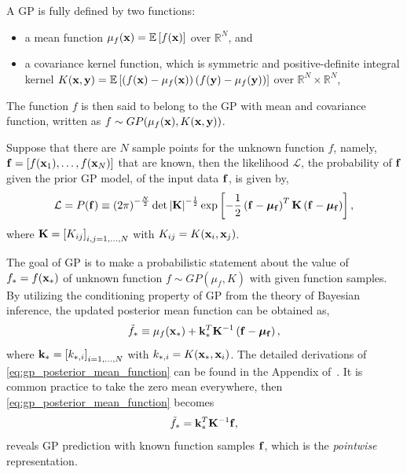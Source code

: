 A GP is fully defined by two functions:
\begin{itemize}
    \item a mean function \( \mu_{f} (\mathbf{x}) = \mathbb{E} \left[ f(\mathbf{x}) \right] \) over \( \mathbb{R}^{N} \), and
    \item a covariance kernel function, which is symmetric and positive-definite integral kernel
        \( K(\mathbf{x}, \mathbf{y}) = \mathbb{E}\left[ \left( f(\mathbf{x}) - \mu_{f} (\mathbf{x}) \right) \left( f(\mathbf{y}) - \mu_{f} (\mathbf{y}) \right) \right] \)
        over \( \mathbb{R}^{N} \times \mathbb{R}^{N} \),
\end{itemize}
The function \( f \) is then said to belong to the GP with mean and covariance function,
written as \( f \sim GP(\mu_{f} (\mathbf{x}), K(\mathbf{x}, \mathbf{y})) \).

Suppose that there are \( N \) sample points for the unknown function \( f \), namely, \( \mathbf{f} = \left[ f(\mathbf{x}_{1}), \dots, f(\mathbf{x}_{N}) \right] \)
that are known, then the likelihood \( \mathcal{L} \), the probability of \( \mathbf{f} \) given the prior GP model,
of the input data \( \mathbf{f} \), is given by,
\begin{equation}\label{eq:gp_likelihood}
    \mathcal{L} = P(\mathbf{f}) \equiv \left( 2 \pi \right)^{- \frac{N}{2}} \det \left| \mathbf{K} \right|^{-\frac{1}{2}}
    \exp \left[ -\frac{1}{2} \left( \mathbf{f} - \bm{\mu}_{\mathbf{f}} \right)^{T} \mathbf{K} \left( \mathbf{f} - \bm{\mu}_{\mathbf{f}} \right) \right],
\end{equation}
where \( \mathbf{K} = \left[ K_{ij} \right]_{i, j = 1, \dots, N} \) with \( K_{ij} = K(\mathbf{x}_{i}, \mathbf{x}_{j}) \).

The goal of GP is to make a probabilistic statement about the value of \( f_{*} = f (\mathbf{x}_{*}) \)
of unknown function \( f \sim GP(\mu_{f}, K) \) with given function samples.
By utilizing the conditioning property of GP from the theory of Bayesian inference,
the updated posterior mean function can be obtained as,
\begin{equation}\label{eq:gp_posterior_mean_function}
    \tilde{f}_{*} \equiv \mu_{f}(\mathbf{x}_{*}) + \mathbf{k}_{*}^{T} \mathbf{K}^{-1} \left( \mathbf{f} - \bm{\mu}_{\mathbf{f}} \right),
\end{equation}
where \( \mathbf{k}_{*} = \left[ k_{*,i} \right]_{i = 1, \dots, N} \) with \( k_{*,i} = K(\mathbf{x}_{*}, \mathbf{x}_{i}) \).
The detailed derivations of \cref{eq:gp_posterior_mean_function} can be found
in the Appendix of~\cite{reyes2018new}.
It is common practice to take the zero mean everywhere, then \cref{eq:gp_posterior_mean_function} becomes
\begin{equation}\label{eq:gp_intp}
    \tilde{f}_{*} = \mathbf{k}_{*}^{T} \mathbf{K}^{-1} \mathbf{f},
\end{equation}
reveals GP prediction with known function samples \( \mathbf{f} \), which is the \textit{pointwise} representation.

